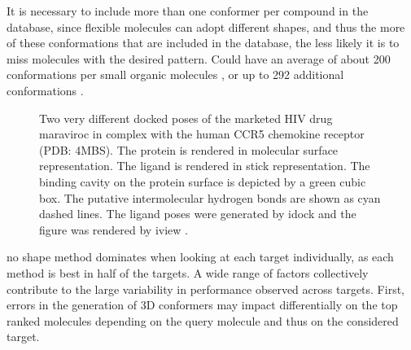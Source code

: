 It is necessary to include more than one conformer per compound in the database, since flexible molecules can adopt different shapes, and thus the more of these conformations that are included in the database, the less likely it is to miss molecules with the desired pattern. Could have an average of about 200 conformations per small organic molecules \citep{1332}, or up to 292 additional conformations \citep{1280}.

\begin{figure}
\centering
{}
\caption{Two very different docked poses of the marketed HIV drug maraviroc in complex with the human CCR5 chemokine receptor (PDB: 4MBS). The protein is rendered in molecular surface representation. The ligand is rendered in stick representation. The binding cavity on the protein surface is depicted by a green cubic box. The putative intermolecular hydrogen bonds are shown as cyan dashed lines. The ligand poses were generated by idock \citep{1153} and the figure was rendered by iview \citep{1366}.}
\label{usr:MRV}
\end{figure}

\citep{1332} no shape method dominates when looking at each target individually, as each method is best in half of the targets. A wide range of factors collectively contribute to the large variability in performance observed across targets. First, errors in the generation of 3D conformers may impact differentially on the top ranked molecules depending on the query molecule and thus on the considered target.

